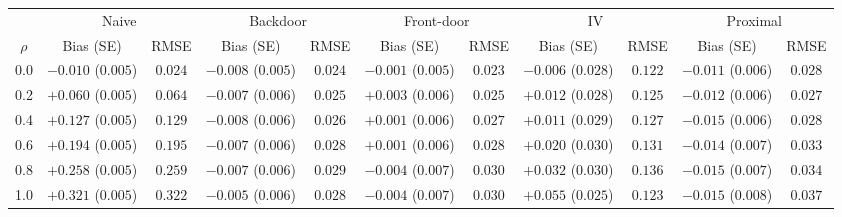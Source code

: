 \small
\begin{tabular}{ccccccccccc}
\toprule
& \multicolumn{2}{c}{Naive} & \multicolumn{2}{c}{Backdoor} & \multicolumn{2}{c}{Front-door} & \multicolumn{2}{c}{IV} & \multicolumn{2}{c}{Proximal} \\
\cmidrule(lr){2-3} \cmidrule(lr){4-5} \cmidrule(lr){6-7} \cmidrule(lr){8-9} \cmidrule(lr){10-11}
$\rho$ & Bias (SE) & RMSE & Bias (SE) & RMSE & Bias (SE) & RMSE & Bias (SE) & RMSE & Bias (SE) & RMSE \\
\midrule
0.0 & $-0.010$ ($0.005$) & $0.024$ & $-0.008$ ($0.005$) & $0.024$ & $-0.001$ ($0.005$) & $0.023$ & $-0.006$ ($0.028$) & $0.122$ & $-0.011$ ($0.006$) & $0.028$ \\
0.2 & $+0.060$ ($0.005$) & $0.064$ & $-0.007$ ($0.006$) & $0.025$ & $+0.003$ ($0.006$) & $0.025$ & $+0.012$ ($0.028$) & $0.125$ & $-0.012$ ($0.006$) & $0.027$ \\
0.4 & $+0.127$ ($0.005$) & $0.129$ & $-0.008$ ($0.006$) & $0.026$ & $+0.001$ ($0.006$) & $0.027$ & $+0.011$ ($0.029$) & $0.127$ & $-0.015$ ($0.006$) & $0.028$ \\
0.6 & $+0.194$ ($0.005$) & $0.195$ & $-0.007$ ($0.006$) & $0.028$ & $+0.001$ ($0.006$) & $0.028$ & $+0.020$ ($0.030$) & $0.131$ & $-0.014$ ($0.007$) & $0.033$ \\
0.8 & $+0.258$ ($0.005$) & $0.259$ & $-0.007$ ($0.006$) & $0.029$ & $-0.004$ ($0.007$) & $0.030$ & $+0.032$ ($0.030$) & $0.136$ & $-0.015$ ($0.007$) & $0.034$ \\
1.0 & $+0.321$ ($0.005$) & $0.322$ & $-0.005$ ($0.006$) & $0.028$ & $-0.004$ ($0.007$) & $0.030$ & $+0.055$ ($0.025$) & $0.123$ & $-0.015$ ($0.008$) & $0.037$ \\
\bottomrule
\end{tabular}
